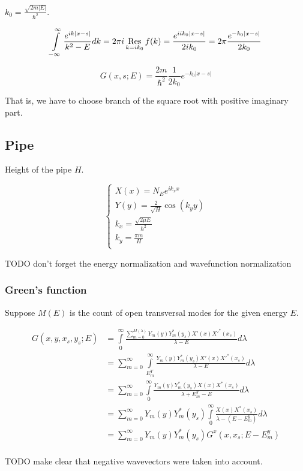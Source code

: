 \documentclass[12pt, a4paper]{article}
\def\res{\mathop{\operatorname{Res}}\limits}
\begin{document}
$k_0 = \frac{\sqrt{2m|E|}}{\hbar^2}$.


$$\int\limits_{-\infty}^\infty \frac{e^{ik|x -s|}}{k^2 - E} dk = 2 \pi i \res\limits_{k = i k_0} f(k) = \frac{e^{i i k_0 |x - s|}}{2 i k_0} = 2 \pi \frac{e^{-k_0 |x - s|}}{2 k_0}$$

$$G(x, s; E) = \frac{2m}{\hbar^2} \frac{1}{2 k_0} e^{-k_0 |x - s|}$$

That is, we have to choose branch of the square root with positive imaginary part.

\subsection{Pipe}

Height of the pipe $H$.

$$\begin{cases}
X(x) = N_E e^{i k_x x} \\
Y(y) = \frac{2}{\sqrt{H}} \cos(k_y y) \\
k_x = \frac{\sqrt{2 \mu E}}{\hbar^2} \\
k_y = \frac{\pi m}{H} \\
\end{cases}$$

TODO don't forget the energy normalization and wavefunction normalization

\subsubsection{Green's function}

Suppose $M(E)$ is the count of open transversal modes for the given energy $E$.

\begin{align*}
G(x, y, x_s, y_s; E)
&= \int\limits_{0}^{\infty} \frac{\sum\limits_{m = 0}^{M(\lambda)} Y_m(y) Y^*_m(y_s) X'(x) X'^*(x_s)  }{\lambda - E} d \lambda \\
&= \sum_{m = 0}^\infty \int\limits_{E^Y_m}^\infty \frac{Y_m(y) Y^*_m(y_s) X'(x) X'^*(x_s)}{\lambda - E} d\lambda \\
&= \sum_{m = 0}^\infty \int\limits_{0}^\infty \frac{Y_m(y) Y_m^*(y_s) X(x) X^*(x_s)}{\lambda + E^y_m - E} d\lambda \\
&= \sum_{m = 0}^\infty Y_m(y) Y^*_m(y_s) \int\limits_{0}^\infty \frac{X(x) X^*(x_s)}{\lambda - (E - E^y_m)} d\lambda \\
&= \sum_{m = 0}^\infty Y_m(y) Y^*_m(y_s) G^x(x, x_s; E - E^y_m) \\
\end{align*}

TODO make clear that negative wavevectors were taken into account.
\end{document}

